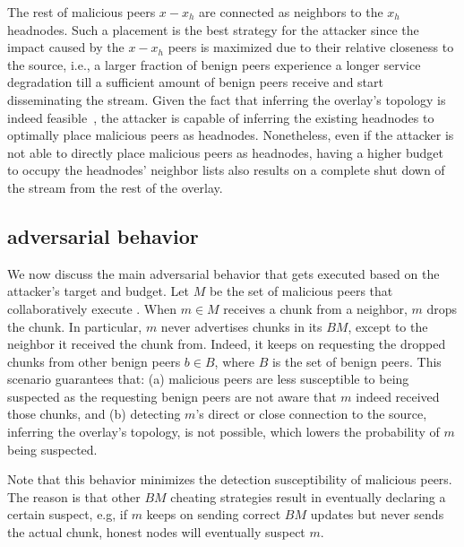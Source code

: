 The rest of malicious peers $x-x_h$ are connected as neighbors to the $x_h$ headnodes. 
Such a placement is the best strategy for the attacker since the impact caused by the $x-x_h$ peers is maximized due to their relative closeness to the source, i.e., a larger fraction of benign peers experience a longer service degradation till a sufficient amount of benign peers receive and start disseminating the stream.
Given the fact that inferring the overlay's topology is indeed feasible~\cite{nguyen2016swap,rbcs}, the attacker is capable of inferring the existing headnodes to optimally place malicious peers as headnodes.
Nonetheless, even if the attacker is not able to directly place malicious peers as headnodes, having a higher budget to occupy the headnodes' neighbor lists also results on a complete shut down of the stream from the rest of the overlay.



\subsection{\drop adversarial behavior}
We now discuss the main adversarial behavior that gets executed based on the attacker's target and budget. 
Let $M$ be the set of malicious peers that collaboratively execute \drop. 
When $m \in M$ receives a chunk from a neighbor, $m$ drops the chunk.
In particular, $m$ never advertises chunks in its $BM$, except to the neighbor it received the chunk from.
Indeed, it keeps on requesting the dropped chunks from other benign peers $b \in B$, where $B$ is the set of benign peers.
This scenario guarantees that: (a) malicious peers are less susceptible to being suspected as the requesting benign peers are not aware that $m$ indeed received those chunks,
and (b) detecting $m$'s direct or close connection to the source, inferring the overlay's topology, is not possible, which lowers the probability of $m$ being suspected.


Note that this behavior minimizes the detection susceptibility of malicious peers.
The reason is that other $BM$ cheating strategies result in eventually declaring a certain suspect, e.g, if $m$ keeps on sending correct $BM$ updates but never sends the actual chunk, honest nodes will eventually suspect $m$.


 





